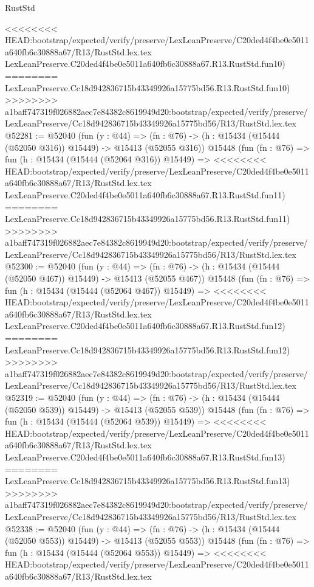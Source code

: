 \begin{lexlean}{RustStd}
\begin{coremodule}
{\begin{coremodule}
{{{{{{{{{{{{{{{{{{{{{{{{{{{{{{{{{{{{{{{{{{{{{{{{{{{{{{{{{{{{<<<<<<<< HEAD:bootstrap/expected/verify/preserve/LexLeanPreserve/C20ded4f4be0e5011a640fb6c30888a67/R13/RustStd.lex.tex
    LexLeanPreserve.C20ded4f4be0e5011a640fb6c30888a67.R13.RustStd.fun10)
========
    LexLeanPreserve.Cc18d942836715b43349926a15775bd56.R13.RustStd.fun10)
>>>>>>>> a1baff747319f026882aec7e84382c8619949d20:bootstrap/expected/verify/preserve/LexLeanPreserve/Cc18d942836715b43349926a15775bd56/R13/RustStd.lex.tex
@52281 := @52040
    (fun (y : @44) =>
    (fn : @76) -> (h : @15434 (@15444 (@52050 @316)) @15449) -> @15413 (@52055 @316))
    @15448
    (fun (fn : @76) =>
    fun (h : @15434 (@15444 (@52064 @316)) @15449) =>
<<<<<<<< HEAD:bootstrap/expected/verify/preserve/LexLeanPreserve/C20ded4f4be0e5011a640fb6c30888a67/R13/RustStd.lex.tex
    LexLeanPreserve.C20ded4f4be0e5011a640fb6c30888a67.R13.RustStd.fun11)
========
    LexLeanPreserve.Cc18d942836715b43349926a15775bd56.R13.RustStd.fun11)
>>>>>>>> a1baff747319f026882aec7e84382c8619949d20:bootstrap/expected/verify/preserve/LexLeanPreserve/Cc18d942836715b43349926a15775bd56/R13/RustStd.lex.tex
@52300 := @52040
    (fun (y : @44) =>
    (fn : @76) -> (h : @15434 (@15444 (@52050 @467)) @15449) -> @15413 (@52055 @467))
    @15448
    (fun (fn : @76) =>
    fun (h : @15434 (@15444 (@52064 @467)) @15449) =>
<<<<<<<< HEAD:bootstrap/expected/verify/preserve/LexLeanPreserve/C20ded4f4be0e5011a640fb6c30888a67/R13/RustStd.lex.tex
    LexLeanPreserve.C20ded4f4be0e5011a640fb6c30888a67.R13.RustStd.fun12)
========
    LexLeanPreserve.Cc18d942836715b43349926a15775bd56.R13.RustStd.fun12)
>>>>>>>> a1baff747319f026882aec7e84382c8619949d20:bootstrap/expected/verify/preserve/LexLeanPreserve/Cc18d942836715b43349926a15775bd56/R13/RustStd.lex.tex
@52319 := @52040
    (fun (y : @44) =>
    (fn : @76) -> (h : @15434 (@15444 (@52050 @539)) @15449) -> @15413 (@52055 @539))
    @15448
    (fun (fn : @76) =>
    fun (h : @15434 (@15444 (@52064 @539)) @15449) =>
<<<<<<<< HEAD:bootstrap/expected/verify/preserve/LexLeanPreserve/C20ded4f4be0e5011a640fb6c30888a67/R13/RustStd.lex.tex
    LexLeanPreserve.C20ded4f4be0e5011a640fb6c30888a67.R13.RustStd.fun13)
========
    LexLeanPreserve.Cc18d942836715b43349926a15775bd56.R13.RustStd.fun13)
>>>>>>>> a1baff747319f026882aec7e84382c8619949d20:bootstrap/expected/verify/preserve/LexLeanPreserve/Cc18d942836715b43349926a15775bd56/R13/RustStd.lex.tex
@52338 := @52040
    (fun (y : @44) =>
    (fn : @76) -> (h : @15434 (@15444 (@52050 @553)) @15449) -> @15413 (@52055 @553))
    @15448
    (fun (fn : @76) =>
    fun (h : @15434 (@15444 (@52064 @553)) @15449) =>
<<<<<<<< HEAD:bootstrap/expected/verify/preserve/LexLeanPreserve/C20ded4f4be0e5011a640fb6c30888a67/R13/RustStd.lex.tex
}}}}}}}}}}}}}}}}}}}}}}}}}}}}}}}}}}}}}}}}}}}}}}}}}}}}}}}}}}}}
\end{coremodule}}
\end{coremodule}
\end{lexlean}
